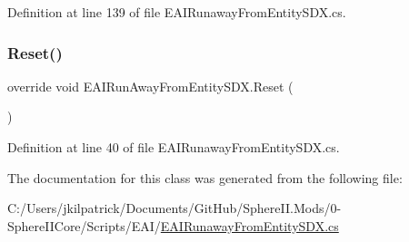Definition at line 139 of file E\+A\+I\+Runaway\+From\+Entity\+S\+D\+X.\+cs.

\mbox{\label{class_e_a_i_run_away_from_entity_s_d_x_a0aed936e205eb5f5634ece8528f61f95}} 
\subsubsection{\texorpdfstring{Reset()}{Reset()}}
{\footnotesize\ttfamily override void E\+A\+I\+Run\+Away\+From\+Entity\+S\+D\+X.\+Reset (\begin{DoxyParamCaption}{ }\end{DoxyParamCaption})}



Definition at line 40 of file E\+A\+I\+Runaway\+From\+Entity\+S\+D\+X.\+cs.



The documentation for this class was generated from the following file\+:\begin{DoxyCompactItemize}
\item 
C\+:/\+Users/jkilpatrick/\+Documents/\+Git\+Hub/\+Sphere\+I\+I.\+Mods/0-\/\+Sphere\+I\+I\+Core/\+Scripts/\+E\+A\+I/\mbox{\hyperlink{_e_a_i_runaway_from_entity_s_d_x_8cs}{E\+A\+I\+Runaway\+From\+Entity\+S\+D\+X.\+cs}}\end{DoxyCompactItemize}
